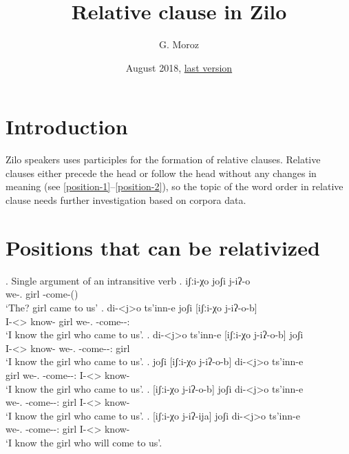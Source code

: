 
\title{\Large Relative clause in Zilo}
\author{G. Moroz}
\date{August 2018, \href{https://github.com/agricolamz/2018_Andi_relative_clause/raw/master/main.pdf}{last version}}
 
\maketitle

\section{Introduction}
Zilo speakers uses participles for the formation of relative clauses. Relative clauses either precede the head or follow the head without any changes in meaning (see \ref{position-1}--\ref{position-2}), so the topic of the word order in relative clause needs further investigation based on corpora data.

\section{Positions that can be relativized}

\ex. Single argument of an intransitive verb
	\ag. iʃːi-χo joʃi j-iʔ-o\\
		 {we-\Add.\Lat} {girl} {\F-come-\Pst(\Aor)}\\
		 \glt    `The? girl came to us'
	\bg. di-<j>o ts'inn-e joʃi [iʃːi-χo j-iʔ-o-b]\\
		 {I-<\F>\Aff} {know-\Hab} {girl} {we-\Add.\Lat} {\F-come-\Pst-\Ptcp:\Pst}\\
		 \glt    `I know the girl who came to us'. \label{position-1}
	\bg. di-<j>o ts'inn-e [iʃːi-χo j-iʔ-o-b] joʃi \\
		 {I-<\F>\Aff} {know-\Hab} {we-\Add.\Lat} {\F-come-\Pst-\Ptcp:\Pst} {girl}\\
		 \glt    `I know the girl who came to us'.
	\bg. joʃi  [iʃːi-χo j-iʔ-o-b] di-<j>o ts'inn-e \\
		  {girl}  {we-\Add.\Lat} {\F-come-\Pst-\Ptcp:\Pst} {I-<\F>\Aff} {know-\Hab}\\
		 \glt    `I know the girl who came to us'.
	\bg. [iʃːi-χo j-iʔ-o-b] joʃi di-<j>o ts'inn-e \\
		  {we-\Add.\Lat} {\F-come-\Pst-\Ptcp:\Pst} {girl} {I-<\F>\Aff} {know-\Hab}\\
		 \glt    `I know the girl who came to us'. \label{position-2}
	\bg. [iʃːi-χo j-iʔ-ija] joʃi di-<j>o ts'inn-e \\
		  {we-\Add.\Lat} {\F-come-\Pst-\Ptcp:\Prae} {girl} {I-<\F>\Aff} {know-\Hab}\\
		 \glt    `I know the girl who will come to us'. 

